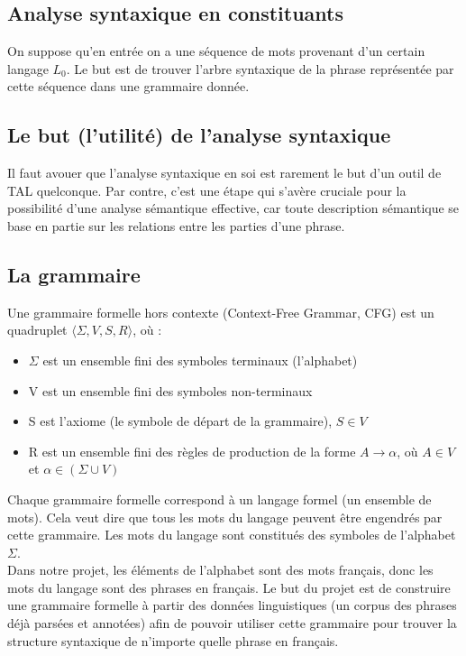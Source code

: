 \documentclass[12pt]{article}
\begin{document}
\subsection{Analyse syntaxique en constituants}
 On suppose qu'en entr\'ee on a une s\'equence de mots provenant d'un certain
 langage $L_0$. Le but est de trouver l'arbre syntaxique de la phrase
 repr\'esent\'ee par cette s\'equence dans une grammaire donn\'ee.

\subsection{Le but (l'utilit\'e) de l'analyse syntaxique}

Il faut avouer que l'analyse syntaxique en soi est rarement le but d'un outil de
TAL quelconque. Par contre, c'est une \'etape qui s'av\`ere cruciale pour la
possibilit\'e d'une analyse s\'emantique effective, car toute description
s\'emantique se base en partie sur les relations entre les parties d'une
phrase.

\subsection{La grammaire}

Une grammaire formelle hors contexte (Context-Free Grammar, CFG) est un
quadruplet $\langle \Sigma, V, S, R \rangle$, o\`u :
\begin{itemize}
\item $\Sigma$ est un ensemble fini des symboles terminaux (l'alphabet)
\item V est un ensemble fini des symboles non-terminaux
\item S est l'axiome (le symbole de d\'epart de la grammaire), $S \in V$
\item R est un ensemble fini des r\`egles de production de la forme $A
\rightarrow \alpha$, o\`u $A \in V$ et $\alpha \in (\Sigma \cup V)$
\end{itemize}

Chaque grammaire formelle correspond \`a un langage formel (un ensemble de mots).
Cela veut dire que tous les mots du langage peuvent \^etre engendr\'es par cette
grammaire. Les mots du langage sont constitu\'es des symboles de l'alphabet
$\Sigma$.\\

Dans notre projet, les \'el\'ements de l'alphabet sont des mots français, donc les
mots du langage sont des phrases en français. Le but du projet est de construire
une grammaire formelle \`a partir des donn\'ees linguistiques (un corpus des phrases
d\'ej\`a pars\'ees et annot\'ees) afin de pouvoir utiliser cette grammaire pour trouver
la structure syntaxique de n'importe quelle phrase en français.
\end{document}
